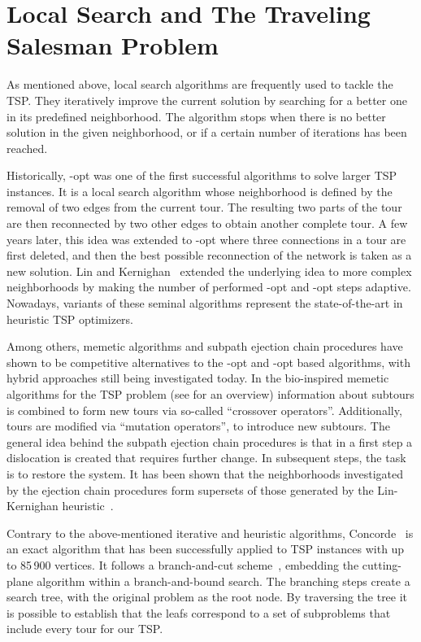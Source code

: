 \documentclass{article}
\begin{document}
\section{Local Search and The Traveling Salesman Problem}
\label{sec2}
As mentioned above, local search algorithms are frequently used to
tackle the TSP. They iteratively improve the current solution by
searching for a better one in its predefined neighborhood. The
algorithm stops when there is no better solution in the given
neighborhood, or if a certain number of iterations has been reached.

Historically, -opt \cite{croes1958} was one of the first successful
algorithms to solve larger TSP instances. It is a local search
algorithm whose neighborhood is defined by the removal of two edges
from the current tour. The resulting two parts of the tour are then
reconnected by two other edges to obtain another complete tour.  A few
years later, this idea was extended to -opt \cite{Lin:1965} where
three connections in a tour are first deleted, and then the best
possible reconnection of the network is taken as a new solution.  Lin
and Kernighan~\cite{LinKin73} extended the underlying idea to more
complex neighborhoods by making the number of performed -opt and
-opt steps adaptive. Nowadays, variants of these seminal algorithms
represent the state-of-the-art in heuristic TSP optimizers.

Among others, memetic algorithms and subpath ejection chain procedures
have shown to be competitive alternatives to the -opt and -opt
based algorithms, with hybrid approaches still being investigated
today.  In the bio-inspired memetic algorithms for the TSP problem
(see \cite{merz2001} for an overview) information about subtours is
combined to form new tours via so-called ``crossover
operators''. Additionally, tours are modified via ``mutation
operators'', to introduce new subtours. The general idea behind the
subpath ejection chain procedures is that in a first step a
dislocation is created that requires further change. In subsequent
steps, the task is to restore the system. It has been shown that the
neighborhoods investigated by the ejection chain procedures form
supersets of those generated by the Lin-Kernighan
heuristic~\cite{journals/dam/Glover96}.

Contrary to the above-mentioned iterative and heuristic algorithms,
Concorde~\cite{journals/informs/ApplegateCDR02} is an exact algorithm
that has been successfully applied to TSP instances with up to 85\,900
vertices. It follows a branch-and-cut scheme~\cite{PadbergRinaldi:91},
embedding the cutting-plane algorithm within a branch-and-bound
search.  The branching steps create a search tree, with the original
problem as the root node.  By traversing the tree it is possible to
establish that the leafs correspond to a set of subproblems that
include every tour for our TSP.
\end{document}

